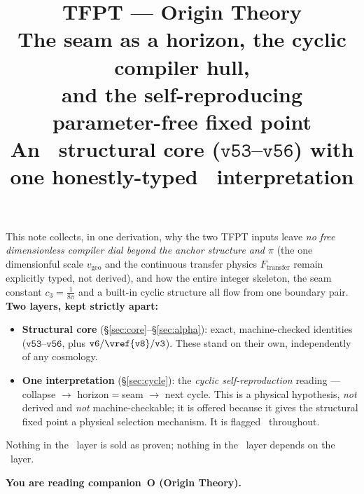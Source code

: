 \documentclass[11pt,a4paper]{article}
\title{\vspace{-1.2cm}\textbf{TFPT --- Origin Theory}\\[2mm]
\large The seam as a horizon, the cyclic compiler hull,\\
and the self-reproducing parameter-free fixed point\\[2mm]
\normalsize\textmd{An \mE\ structural core ($\mathtt{v53}$--$\mathtt{v56}$) with one honestly-typed \mC\ interpretation}}
\author{\TFPTauthors}\date{\TFPTdatestamp}
\newcommand{\cthree}{c_3}
\begin{document}
\maketitle
\vspace{-0.7cm}

\begin{keybox}
This note collects, in one derivation, why the two TFPT inputs leave \emph{no free dimensionless
compiler dial beyond the anchor structure and $\pi$} (the one dimensionful scale $v_{\mathrm{geo}}$ and
the continuous transfer physics $F_{\mathrm{transfer}}$ remain explicitly typed, not derived), and how
the entire integer skeleton, the seam constant $\cthree=\tfrac1{8\pi}$ and a built-in cyclic
structure all flow from one boundary pair. \textbf{Two layers, kept strictly apart:}
\begin{itemize}[leftmargin=1.3em]
\item \textbf{Structural core \mE} (\S\ref{sec:core}--\S\ref{sec:alpha}): exact, machine-checked
identities ($\mathtt{v53}$--$\mathtt{v56}$, plus $\mathtt{v6/\vref{v8}/v3}$). These stand on their own,
independently of any cosmology.
\item \textbf{One interpretation \mC} (\S\ref{sec:cycle}): the \emph{cyclic self-reproduction} reading
--- collapse $\to$ horizon$=$seam $\to$ next cycle. This is a physical hypothesis, \emph{not} derived and
\emph{not} machine-checkable; it is offered because it gives the structural fixed point a physical
selection mechanism. It is flagged \mC\ throughout.
\end{itemize}
Nothing in the \mC\ layer is sold as proven; nothing in the \mE\ layer depends on the \mC\ layer.
\end{keybox}
\markerkey

\tableofcontents


\noindent\textbf{You are reading \textbf{companion~O} (Origin Theory).}


\TFPTbadges
\TFPTclaimstack[anchor]

\bigskip

\end{document}
